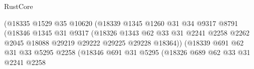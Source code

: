\begin{lexlean}{RustCore}
\begin{coremodule}
                                          (@18335
                                            @1529
                                            @35
                                            @10620
                                            (@18339
                                              @1345
                                              @1260
                                              @31
                                              @34
                                              @9317
                                              @8791
                                              (@18346
                                                @1345
                                                @31
                                                @9317
                                                (@18326
                                                  @1343
                                                  @62
                                                  @33
                                                  @31
                                                  @2241
                                                  @2258
                                                  @2262
                                                  @2045
                                                  @18088
                                                  @29219
                                                  @29222
                                                  @29225
                                                  @29228
                                                  @18364))
                                              (@18339
                                                @691
                                                @62
                                                @31
                                                @33
                                                @5295
                                                @2258
                                                (@18346
                                                  @691
                                                  @31
                                                  @5295
                                                  (@18326
                                                    @689
                                                    @62
                                                    @33
                                                    @31
                                                    @2241
                                                    @2258

\end{coremodule}
\end{lexlean}
